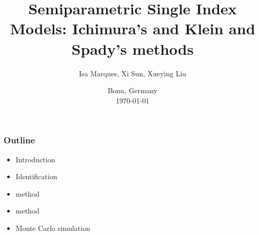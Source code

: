 \documentclass{beamer}
\title[Ichimura's and Klein and Spady's methods]{Semiparametric Single Index Models: Ichimura's and Klein and Spady's methods} %
\begin{document}
\author{Isa Marques, Xi Sun, Xueying Liu} %
{
}

\date{
{\small Bonn, Germany}\\
{\small \today}
}

\begin{frame}
\titlepage %
\end{frame}





\begin{frame}[t]
    \frametitle{Outline}
    
    \begin{itemize}
        \item Introduction
        \item Identification
        \item \citet{Ichimura93} method
        \item \citet{KleinSpady93} method
        \item Monte Carlo simulation
    \end{itemize}
    \note{~}
\end{frame}
\end{document}
